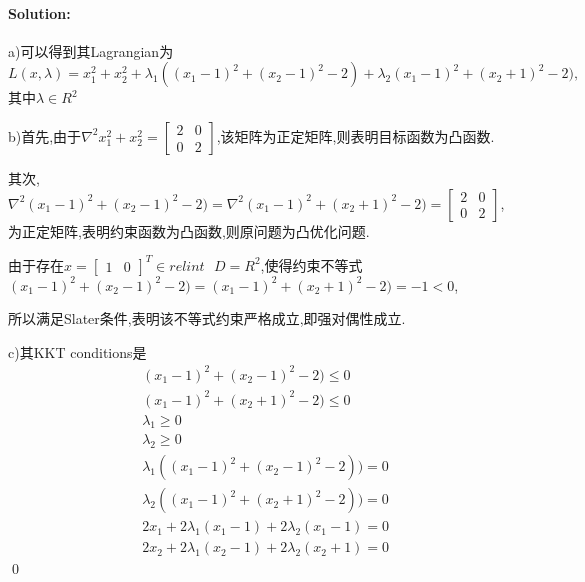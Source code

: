 \documentclass[a4paper]{ctexart}
\newenvironment{solution}
{\color{blue} \paragraph{Solution:\\}}
{\newline \qed}
\begin{document}
\begin{solution}
    a)可以得到其Lagrangian为$L(x,\lambda)=x_1^2+x_2^2+\lambda_1((x_1-1)^2+(x_2-1)^2-2)+\lambda_2(x_1-1)^2+(x_2+1)^2-2),$其中$\lambda \in R^2$

    b)首先,由于$\nabla^2x_1^2+x_2^2=\begin{bmatrix} 2 & 0 \\ 0 & 2 \end{bmatrix}$,该矩阵为正定矩阵,则表明目标函数为凸函数.

    其次,$\nabla^2(x_1-1)^2+(x_2-1)^2-2)=\nabla^2(x_1-1)^2+(x_2+1)^2-2)=\begin{bmatrix} 2 & 0 \\ 0 & 2 \end{bmatrix}$,为正定矩阵,表明约束函数为凸函数,则原问题为凸优化问题.

    由于存在$x=\begin{bmatrix} 1 & 0 \end{bmatrix}^T \in relint \text{ }D=R^2$,使得约束不等式$(x_1-1)^2+(x_2-1)^2-2)=(x_1-1)^2+(x_2+1)^2-2)=-1<0$,

    所以满足Slater条件,表明该不等式约束严格成立,即强对偶性成立.

    c)其KKT conditions是\begin{align*}
         & (x_1-1)^2+(x_2-1)^2-2)\leq 0               \\
         & (x_1-1)^2+(x_2+1)^2-2)\leq 0               \\
         & \lambda_1\geq 0                            \\
         & \lambda_2\geq 0                            \\
         & \lambda_1((x_1-1)^2+(x_2-1)^2-2))=0        \\
         & \lambda_2((x_1-1)^2+(x_2+1)^2-2))=0        \\
         & 2x_1+2\lambda_1(x_1-1)+2\lambda_2(x_1-1)=0 \\
         & 2x_2+2\lambda_1(x_2-1)+2\lambda_2(x_2+1)=0
    \end{align*}
\end{solution}
\end{document}
